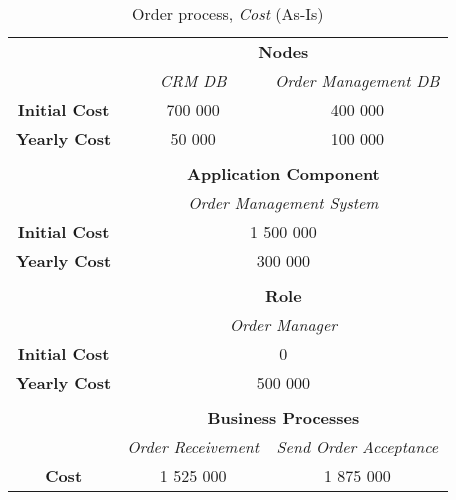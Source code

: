 \begin{table}[H]
	\centering
	\begin{tabular}{|c|c|p{2cm}|p{2.5cm}|p{2.5cm}|p{2.5cm}|}
		\cline{3-6}

		\multicolumn{2}{c}{} & \multicolumn{4}{|c|}{\textbf{Nodes}} \\ \cline{3-6}
		\multicolumn{2}{c|}{} & \multicolumn{2}{c|}{\textsl{CRM DB}} & \multicolumn{2}{c|}{\textsl{Order Management DB}} \\
		\hline
		\multicolumn{2}{|c|}{\textbf{Initial Cost}} & \multicolumn{2}{c|}{700 000} & \multicolumn{2}{c|}{400 000} \\ \hline
		\multicolumn{2}{|c|}{\textbf{Yearly Cost}}  & \multicolumn{2}{c|}{50 000} & \multicolumn{2}{c|}{100 000} \\ \hline
		
		\multicolumn{6}{c}{} \\ \cline{3-6}
		\multicolumn{2}{c}{} & \multicolumn{4}{|c|}{\textbf{Application Component}} \\ \cline{3-6}
		\multicolumn{2}{c|}{} & \multicolumn{4}{c|}{\textsl{Order Management System}} \\
		\hline
		\multicolumn{2}{|c|}{\textbf{Initial Cost}} & \multicolumn{4}{c|}{1 500 000}  \\ \hline
		\multicolumn{2}{|c|}{\textbf{Yearly Cost}}  & \multicolumn{4}{c|}{300 000}  \\ \hline

		
		\multicolumn{6}{c}{} \\ \cline{3-6}
		\multicolumn{2}{c}{} & \multicolumn{4}{|c|}{\textbf{Role}} \\ \cline{3-6}
		\multicolumn{2}{c|}{} & \multicolumn{4}{c|}{\textsl{Order Manager}} \\
		\hline
		\multicolumn{2}{|c|}{\textbf{Initial Cost}} & \multicolumn{4}{c|}{0}  \\ \hline
		\multicolumn{2}{|c|}{\textbf{Yearly Cost}}  & \multicolumn{4}{c|}{500 000}  \\ \hline


		\multicolumn{6}{c}{} \\ \cline{3-6}
		\multicolumn{2}{c}{} & \multicolumn{4}{|c|}{\textbf{Business Processes}} \\ \cline{3-6}
		\multicolumn{2}{c|}{} & \multicolumn{2}{c|}{\textsl{Order Receivement}} & \multicolumn{2}{c|}{\textsl{Send Order Acceptance}} \\
		\hline
		\multicolumn{2}{|c|}{\textbf{Cost}} & \multicolumn{2}{c|}{1 525 000} & \multicolumn{2}{c|}{1 875 000} \\ \hline

	\end{tabular}
\caption{Order process, \textsl{Cost} (As-Is)} 
\label{tab:order_cost_as_is}
\end{table}